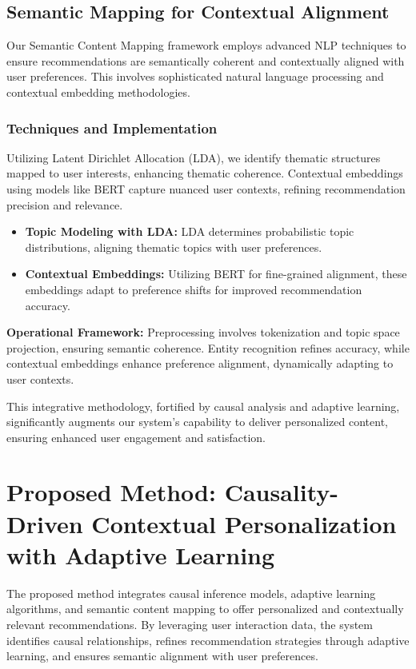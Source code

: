 \documentclass{article} %
\begin{document}
\subsection{Semantic Mapping for Contextual Alignment}

Our Semantic Content Mapping framework employs advanced NLP techniques to ensure recommendations are semantically coherent and contextually aligned with user preferences. This involves sophisticated natural language processing and contextual embedding methodologies.

\subsubsection{Techniques and Implementation}

Utilizing Latent Dirichlet Allocation (LDA), we identify thematic structures mapped to user interests, enhancing thematic coherence. Contextual embeddings using models like BERT capture nuanced user contexts, refining recommendation precision and relevance.

\begin{itemize}
    \item \textbf{Topic Modeling with LDA:} LDA determines probabilistic topic distributions, aligning thematic topics with user preferences.
    \item \textbf{Contextual Embeddings:} Utilizing BERT for fine-grained alignment, these embeddings adapt to preference shifts for improved recommendation accuracy.
\end{itemize}

\textbf{Operational Framework:} Preprocessing involves tokenization and topic space projection, ensuring semantic coherence. Entity recognition refines accuracy, while contextual embeddings enhance preference alignment, dynamically adapting to user contexts.

This integrative methodology, fortified by causal analysis and adaptive learning, significantly augments our system's capability to deliver personalized content, ensuring enhanced user engagement and satisfaction.


\section{Proposed Method: Causality-Driven Contextual Personalization with Adaptive Learning}

The proposed method integrates causal inference models, adaptive learning algorithms, and semantic content mapping to offer personalized and contextually relevant recommendations. By leveraging user interaction data, the system identifies causal relationships, refines recommendation strategies through adaptive learning, and ensures semantic alignment with user preferences.
\end{document}
